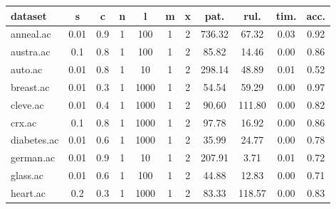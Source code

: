 \begin{table}[htbp]
	\centering
		\begin{tabular}{|l|c|c|c|c|c|c||c|c|c|c|}
		\hline
		\textbf{dataset}	& \textbf{s}	& \textbf{c}	& \textbf{n}	& \textbf{l}	& \textbf{m}	& \textbf{x}	& \textbf{pat.}	& \textbf{rul.}	& \textbf{tim.}	& \textbf{acc.}	\\
		\hline
		anneal.ac      & 0.01     & 0.9         & 1              & 100                 & 1             & 2             & 736.32         & 67.32          & 0.03           & 0.92           \\
		\hline
		austra.ac      & 0.1      & 0.8         & 1              & 100                 & 1             & 2             & 85.82          & 14.46          & 0.00           & 0.86           \\
		\hline
		auto.ac        & 0.01     & 0.8         & 1              & 10                  & 1             & 2             & 298.14         & 48.89          & 0.01           & 0.52           \\
		\hline
		breast.ac      & 0.01     & 0.3         & 1              & 1000                & 1             & 2             & 54.54          & 59.29          & 0.00           & 0.97           \\
		\hline
		cleve.ac       & 0.01     & 0.4         & 1              & 1000                & 1             & 2             & 90.60          & 111.80         & 0.00           & 0.82           \\
		\hline
		crx.ac         & 0.1      & 0.8         & 1              & 1000                & 1             & 2             & 97.78          & 16.92          & 0.00           & 0.86           \\
		\hline
		diabetes.ac    & 0.01     & 0.6         & 1              & 1000                & 1             & 2             & 35.99          & 24.77          & 0.00           & 0.78           \\
		\hline
		german.ac      & 0.01     & 0.9         & 1              & 10                  & 1             & 2             & 207.91         & 3.71           & 0.01           & 0.72           \\
		\hline
		glass.ac       & 0.01     & 0.6         & 1              & 100                 & 1             & 2             & 44.88          & 12.83          & 0.00           & 0.71           \\
		\hline
		heart.ac       & 0.2      & 0.3         & 1              & 1000                & 1             & 2             & 83.33          & 118.57         & 0.00           & 0.83           \\

\end{tabular}
\end{table}
